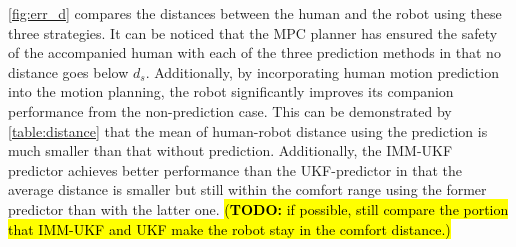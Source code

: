 \documentclass[letterpaper, 10 pt, conference]{ieeeconf}
\newcommand{\todohere}[1]{\hl{(\textbf{TODO:} #1)}}
\begin{document}
	\cref{fig:err_d} compares the distances between the human and the robot using these three strategies.
	It can be noticed that the MPC planner has ensured the safety of the accompanied human with each of the three prediction methods in that no distance goes below $d_s$.
	Additionally, by incorporating human motion prediction into the motion planning, the robot significantly improves its companion performance from the non-prediction case.
	This can be demonstrated by \cref{table:distance} that the mean of human-robot distance using the prediction is much smaller than that without prediction.
	Additionally, the IMM-UKF predictor achieves better performance than the UKF-predictor in that the average distance is smaller but still within the comfort range using the former predictor than with the latter one.
	\todohere{if possible, still compare the portion that IMM-UKF and UKF make the robot stay in the comfort distance.}
\end{document}
